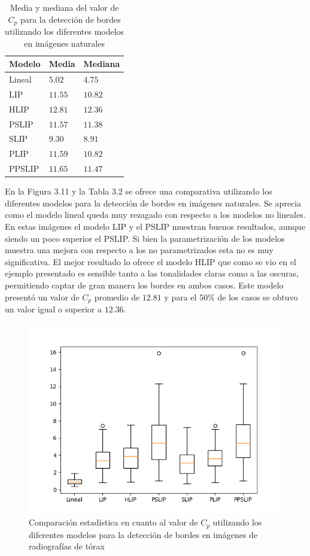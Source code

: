 \begin{table}
	\begin{center}
		\begin{tabular}{|l|l|l|}
			\hline 
			Modelo & Media & Mediana\\
			\hline
			Lineal & $5.02$ & $4.75$\\
			\hline
			LIP & $11.55$ & $10.82$\\
			\hline
			HLIP & $12.81$ & $12.36$\\
			\hline
			PSLIP & $11.57$ & $11.38$\\
			\hline
			SLIP & $9.30$ & $8.91$\\
			\hline
			PLIP & $11.59$ & $10.82$\\
			\hline
			PPSLIP & $11.65$ & $11.47$\\
			\hline
		\end{tabular}
		\caption{Media y mediana del valor de $C_p$ para la detecci\'on de bordes utilizando los diferentes modelos en im\'agenes naturales}
	\end{center}
\end{table}

En la Figura 3.11 y la Tabla 3.2 se ofrece una comparativa utilizando los diferentes modelos para la detecci\'on de bordes en im\'agenes naturales. Se aprecia como el modelo lineal queda muy rezagado con respecto a los modelos no lineales. En estas im\'agenes el modelo LIP y el PSLIP muestran buenos resultados, aunque siendo un poco superior el PSLIP. Si bien la parametrizaci\'on de los modelos muestra una mejora con respecto a los no parametrizados esta no es muy significativa. El mejor resultado lo ofrece el modelo HLIP que como se vio en el ejemplo presentado es sensible tanto a las tonalidades claras como a las oscuras, permitiendo captar de gran manera los bordes en ambos casos. Este modelo present\'o un valor de $C_p$ promedio de $12.81$ y para el $50\%$ de los casos se obtuvo un valor igual o superior a $12.36$. 

\begin{figure}
	\begin{center}
		\includegraphics[width=10.0 cm]{images/graphics/torax/ed/ed_all.png}
		\caption{Comparaci\'on estad\'istica en cuanto al valor de $C_p$ utilizando los diferentes modelos para la detecci\'on de bordes en im\'agenes de radiograf\'ias de t\'orax}
	\end{center}
\end{figure}

